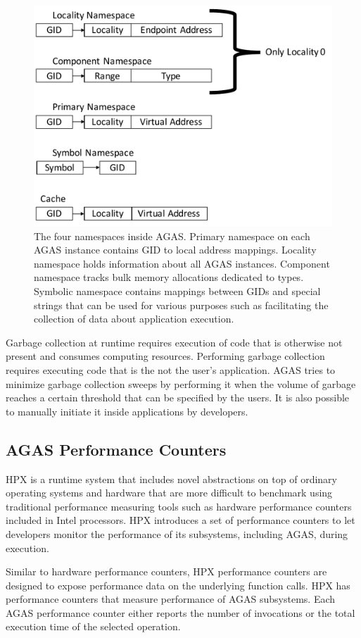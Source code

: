 \begin{figure}[t]
    \centering
    \includegraphics[width=.47\textwidth,height=\textheight,keepaspectratio]{illustrations/agas_intern}
    \caption{The four namespaces inside AGAS. Primary namespace on each AGAS instance contains GID to local address mappings. Locality namespace holds information about all AGAS instances. Component namespace tracks bulk memory allocations dedicated to types. Symbolic namespace contains mappings between GIDs and special strings that can be used for various purposes such as facilitating the collection of data about application execution.}
    \label{fig:agas_intern}
\end{figure}

Garbage collection at runtime requires execution of code that is otherwise not
present and consumes computing resources. Performing garbage collection
requires executing code that is the not the user's application. AGAS tries to
minimize garbage collection sweeps by performing it when the volume of garbage
reaches a certain threshold that can be specified by the users. It is also
possible to manually initiate it inside applications by developers.

\subsection{AGAS Performance Counters}
HPX is a runtime system that includes novel abstractions on top of ordinary
operating systems and hardware that are more difficult to benchmark using traditional
performance measuring tools such as hardware performance counters included in
Intel processors. HPX introduces a set of performance counters to let
developers monitor the performance of its subsystems, including AGAS, during
execution.

Similar to hardware performance counters, HPX performance counters\cite{grubel2015performance} are designed
to expose performance data on the underlying function calls. HPX has
performance counters that measure performance of AGAS subsystems. Each AGAS
performance counter either reports the number of invocations or the total
execution time of the selected operation.

